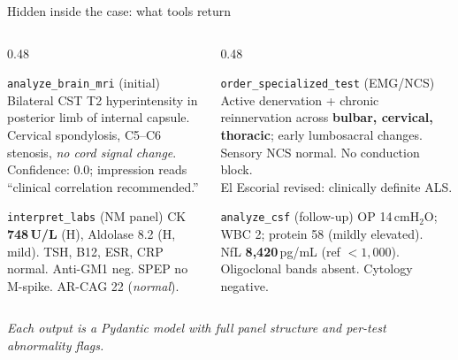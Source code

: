 \documentclass[aspectratio=169,t]{beamer}
\begin{document}
\begin{frame}{Hidden inside the case: what tools return}
  \scriptsize
  \begin{columns}[T,onlytextwidth]
    \begin{column}{0.48\textwidth}
      \begin{block}{\texttt{analyze\_brain\_mri} (initial)}
        Bilateral CST T2 hyperintensity in posterior limb of internal
        capsule. Cervical spondylosis, C5--C6 stenosis,
        \emph{no cord signal change}.\\
        Confidence: 0.0; impression reads ``clinical correlation recommended.''
      \end{block}
      \begin{block}{\texttt{interpret\_labs} (NM panel)}
        CK \textbf{748\,U/L} (H), Aldolase 8.2 (H, mild).
        TSH, B12, ESR, CRP normal. Anti-GM1 neg.
        SPEP no M-spike. AR-CAG 22 (\emph{normal}).
      \end{block}
    \end{column}%
    \hfill
    \begin{column}{0.48\textwidth}
      \begin{exampleblock}{\texttt{order\_specialized\_test} (EMG/NCS)}
        Active denervation + chronic reinnervation across
        \textbf{bulbar, cervical, thoracic}; early lumbosacral
        changes. Sensory NCS normal. No conduction block.\\
        \alert{El Escorial revised: clinically definite ALS.}
      \end{exampleblock}
      \begin{exampleblock}{\texttt{analyze\_csf} (follow-up)}
        OP 14\,cmH$_2$O; WBC 2; protein 58 (mildly elevated).\\
        \alert{NfL \textbf{8{,}420}\,pg/mL} (ref ${<}1{,}000$).
        Oligoclonal bands absent. Cytology negative.
      \end{exampleblock}
    \end{column}
  \end{columns}

  \vspace{0.5mm}
  \centering\scriptsize\itshape
  Each output is a Pydantic model with full panel structure and
  per-test abnormality flags.
\end{frame}
\end{document}

